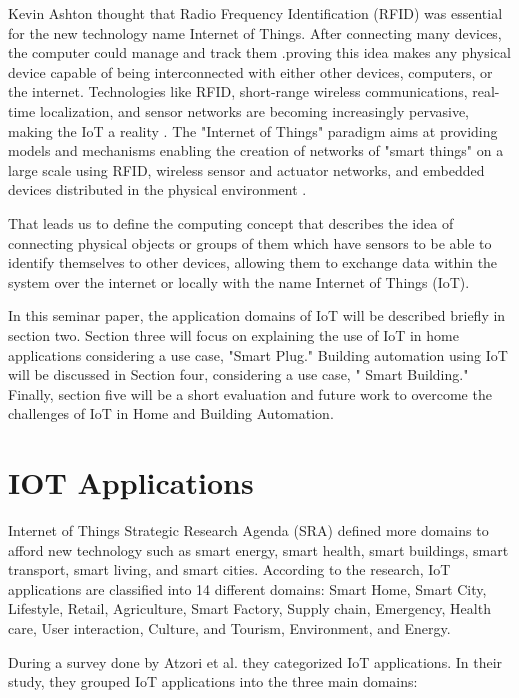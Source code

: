 \documentclass[conference]{IEEEtran}
\begin{document}
Kevin Ashton thought that Radio Frequency Identification (RFID)  was essential for the new technology name Internet of Things.  After connecting many devices, the computer could manage and track them .proving this idea makes any physical device capable of being interconnected with either other devices, computers, or the internet. Technologies like RFID, short-range wireless communications, real-time localization, and sensor networks are becoming increasingly pervasive, making the IoT a reality\cite{book } \cite{discovery}. The "Internet of Things" paradigm aims at providing models and mechanisms enabling the creation of networks of "smart things" on a large scale using RFID, wireless sensor and actuator networks, and embedded devices distributed in the physical environment \cite{RFID}.

That leads us to define the computing concept that describes the idea of connecting physical objects or groups of them which have sensors to be able to identify themselves to other devices, allowing them to exchange data within the system over the internet or locally with the name  Internet of Things (IoT). \cite{por}

In this seminar paper, the application domains of IoT will be described briefly in section two. Section three will focus on explaining the use of IoT in home applications considering a use case, "Smart Plug." Building automation using IoT will be discussed in Section four, considering a use case, " Smart Building." Finally, section five will be a short evaluation and future work to overcome the challenges of IoT in Home and Building Automation.

\section{IOT Applications }


Internet of Things Strategic Research Agenda (SRA) \cite{SRA} defined more domains to afford new technology such as smart energy, smart health, smart buildings, smart transport, smart living, and smart cities\cite{por}. According to the research, IoT applications are classified into 14 different domains: Smart Home, Smart City, Lifestyle, Retail, Agriculture, Smart Factory, Supply chain, Emergency, Health care, User interaction, Culture, and Tourism, Environment, and Energy. \cite{por}


During a survey done by Atzori et al. \cite{azori} they categorized
IoT applications. In their study, they grouped IoT applications   into the  three main domains: 
\end{document}
